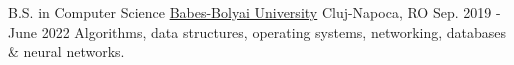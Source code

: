 
\begin{cventries}

  \cventry
  {B.S. in Computer Science} %
  {\href{https://cs.ubbcluj.ro}{Babes-Bolyai University}} %
  {Cluj-Napoca, RO} %
  {Sep. 2019 - June 2022} %
  {
    {Algorithms, data structures, operating systems, networking, databases \& neural networks.}
  }

\end{cventries}
